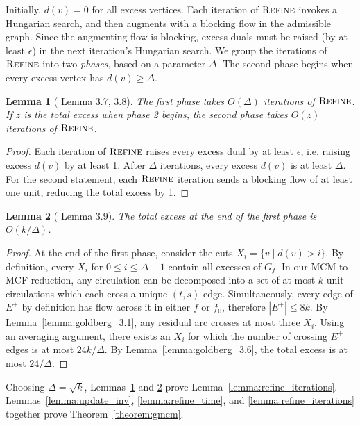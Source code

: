 \documentclass[11pt]{article}
\def\Refine{\textsc{Refine}}
\theoremstyle{plain}
\newtheorem{lemma}{Lemma}
\begin{document}
Initially, $d(v) = 0$ for all excess vertices. 
Each iteration of $\Refine$ invokes a Hungarian search, and then augments with a blocking flow in the admissible graph.
Since the augmenting flow is blocking, excess duals must be raised 
(by at least $\epsilon$) in the next iteration's Hungarian search.
We group the iterations of $\Refine$ into two \emph{phases}, based on a parameter $\Delta$.
The second phase begins when every excess vertex has $d(v) \geq \Delta$.

\begin{lemma}[\cite{DBLP:journals/mst/GoldbergHKT17} Lemma 3.7, 3.8]
\label{lemma:goldberg_3.7}
\label{lemma:goldberg_3.8}
	The first phase takes $O(\Delta)$ iterations of $\Refine$.
	If $z$ is the total excess when phase 2 begins,
	the second phase takes $O(z)$ iterations of $\Refine$.
\end{lemma}
\begin{proof}
	Each iteration of $\Refine$ raises every excess dual by at least $\epsilon$, 
	i.e. raising excess $d(v)$ by at least 1.
	After $\Delta$ iterations, every excess $d(v)$ is at least $\Delta$.
	For the second statement, each $\Refine$ iteration sends a blocking flow 
	of at least one unit, reducing the total excess by 1.
\end{proof}

\begin{lemma}[\cite{DBLP:journals/mst/GoldbergHKT17} Lemma 3.9]
\label{lemma:goldberg_3.9}
	The total excess at the end of the first phase is $O(k/\Delta)$.
\end{lemma}
\begin{proof}
	At the end of the first phase, consider the cuts $X_i = \{v \mid d(v) > i\}$.
	By definition, every $X_i$ for $0 \leq i \leq \Delta-1$ contain all excesses of $G_f$.
	In our MCM-to-MCF reduction, any circulation can be decomposed into 
	a set of at most $k$ unit circulations which each cross a unique $(t, s)$ edge.
	Simultaneously, every edge of $E^+$ by definition has flow across it in either $f$ or $f_0$,
	therefore $|E^+| \leq 8k$.
	By Lemma~\ref{lemma:goldberg_3.1}, any residual arc crosses at most three $X_i$.
	Using an averaging argument, there exists an $X_i$ for which the number of 
	crossing $E^+$ edges is at most $24k/\Delta$.
	By Lemma~\ref{lemma:goldberg_3.6}, the total excess is at most $24/\Delta$.
\end{proof}

Choosing $\Delta = \sqrt{k}$, Lemmas~\ref{lemma:goldberg_3.7} and \ref{lemma:goldberg_3.9} 
prove Lemma~\ref{lemma:refine_iterations}.
Lemmas~\ref{lemma:update_inv}, \ref{lemma:refine_time}, and \ref{lemma:refine_iterations}
together prove Theorem~\ref{theorem:gmcm}.

{


}
\end{document}
